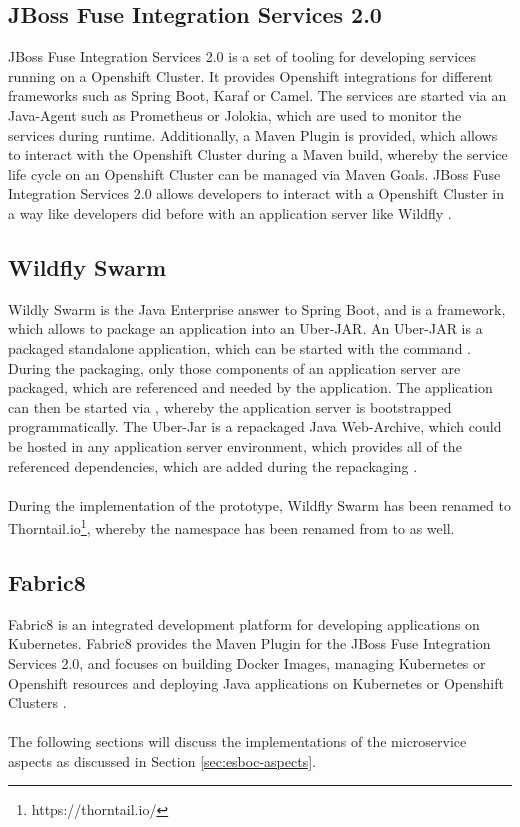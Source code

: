 \subsection{JBoss Fuse Integration Services 2.0}
\label{sec:esbi-technology-fis}
JBoss Fuse Integration Services 2.0 is a set of tooling for developing services running on a Openshift Cluster. It provides Openshift integrations for different frameworks such as Spring Boot, Karaf or Camel. The services are started via an Java-Agent such as Prometheus or Jolokia, which are used to monitor the services during runtime. Additionally, a Maven Plugin is provided, which allows to interact with the Openshift Cluster during a Maven build, whereby the service life cycle on an Openshift Cluster can be managed via Maven Goals. JBoss Fuse Integration Services 2.0 allows developers to interact with a Openshift Cluster in a way like developers did before with an application server like Wildfly \cite{Prometheus2018, Jolokia2018}.

\subsection{Wildfly Swarm}
\label{sec:esbi-technology-swarm}
Wildly Swarm is the Java Enterprise answer to Spring Boot, and is a framework, which allows to package an application into an Uber-JAR. An Uber-JAR is a packaged standalone application, which can be started with the command . During the packaging, only those components of an application server are packaged, which are referenced and needed by the application. The application can then be started via , whereby the application server is bootstrapped programmatically. The Uber-Jar is a repackaged Java Web-Archive, which could be hosted in any application server environment, which provides all of the referenced dependencies, which are added during the repackaging  \cite{WildflySwarm2018}. 
\\ \\
During the implementation of the prototype, Wildfly Swarm has been renamed to Thorntail.io\footnote{https://thorntail.io/}, whereby the namespace has been renamed from  to  as well.

\subsection{Fabric8}
\label{sec:esbi-technology-f8}
Fabric8 is an integrated development platform for developing applications on Kubernetes. Fabric8 provides the Maven Plugin for the JBoss Fuse Integration Services 2.0, and focuses on building Docker Images, managing Kubernetes or Openshift resources and deploying Java applications on Kubernetes or Openshift Clusters \cite{Fabric82018}.
\\ \\
The following sections will discuss the implementations of the microservice aspects as discussed in Section \vref{sec:esboc-aspects}.

